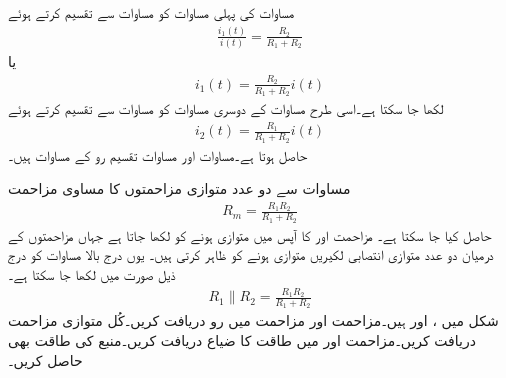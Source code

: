 مساوات  کی پہلی مساوات  کو مساوات  سے تقسیم کرتے ہوئے
\begin{align*}
\frac{i_1(t)}{i(t)}=\frac{R_2}{R_1+R_2}
\end{align*}
یا
\begin{align}\label{مساوات_مزاحمتی_تقسیم_رو_کی_مساوات_الف}
i_1(t)=\frac{R_2}{R_1+R_2} i(t)
\end{align}
لکھا جا سکتا ہے۔اسی طرح مساوات  کے دوسری مساوات  کو مساوات  سے تقسیم کرتے ہوئے
\begin{align}\label{مساوات_مزاحمتی_تقسیم_رو_کی_مساوات_ب}
i_2(t)=\frac{R_1}{R_1+R_2} i(t)
\end{align}
حاصل ہوتا ہے۔مساوات  اور مساوات  تقسیم رو کے مساوات ہیں۔

مساوات  سے دو عدد متوازی مزاحمتوں کا مساوی مزاحمت 
\begin{align}
R_m=\frac{R_1 R_2}{R_1+R_2}
\end{align}
حاصل کیا جا سکتا ہے۔ مزاحمت  اور  کا آپس میں متوازی ہونے کو  لکھا جاتا ہے جہاں مزاحمتوں کے درمیان دو عدد متوازی انتصابی لکیریں متوازی ہونے کو ظاہر کرتی ہیں۔ یوں درج بالا مساوات کو درج ذیل صورت میں لکھا جا سکتا ہے۔
\begin{align*}
R_1 \parallel R_2=\frac{R_1 R_2}{R_1+R_2}
\end{align*}
شکل  میں ،  اور  ہیں۔مزاحمت  اور مزاحمت  میں رو دریافت کریں۔کُل متوازی مزاحمت دریافت کریں۔مزاحمت  اور  میں طاقت کا ضیاع دریافت کریں۔منبع کی طاقت بھی حاصل کریں۔

